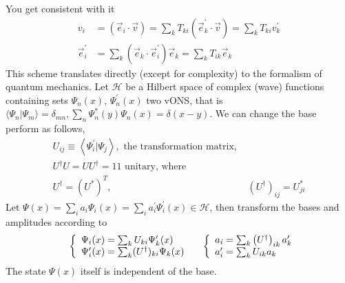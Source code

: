 You get consistent with it
\begin{equation}
\begin{aligned} v_{i} &=\left(\vec{e}_{i} \cdot \vec{v}\right)=\sum_{k} T_{k i}\left(\vec{e}_{k}^{\prime} \cdot \vec{v}\right)=\sum_{k} T_{k i} v_{k}^{\prime} \\ \vec{e}_{i}^{\prime} &=\sum_{k}\left(\vec{e}_{k} \cdot \vec{e}_{i}^{\prime}\right) \vec{e}_{k}=\sum_{k} T_{i k} \vec{e}_{k} \end{aligned}
\end{equation}
This scheme translates directly (except for complexity) to the formalism of quantum mechanics. Let $\mathcal{H}$ be a Hilbert space of complex (wave) functions containing sets {$\Psi_n(x)$}, {$\Psi_n^{\prime}(x)$} two vONS, that is $\langle\Psi_n|\Psi_m\rangle=\delta_{mn},\sum_n\Psi^*_n(y)\Psi_n(x)=\delta(x-y)$. We can change the base perform as follows,
\begin{equation}
\begin{aligned} U_{i j} \equiv\left\langle\Psi_{i}^{\prime} | \Psi_{j}\right\rangle, \text { the transformation matrix, } \\ U^{\dagger} U=U U^{\dagger}=11 \text { unitary, where } \\ U^{\dagger}=\left(U^{*}\right)^{T}, &\left(U^{\dagger}\right)_{i j}=U_{j i}^{*} \end{aligned}
\end{equation}
Let $\Psi(x)=\sum_ia_i\Psi_i(x)=\sum_ia^{\prime}_i\Psi_i^{\prime}(x)\in\mathcal{H}$, then transform the bases and amplitudes according to
\begin{equation}
\quad\left\{\begin{array}{l}{\Psi_{i}(x)=\sum_{k} U_{k i} \Psi_{k}^{\prime}(x)} \\ {\Psi_{i}^{\prime}(x)=\sum_{k} (U^{\dagger})_{ki} \Psi_k(x)}\end{array}\right.\\
\quad\left\{\begin{array}{l}{a_{i}=\sum_{k}\left(U^{\dagger}\right)_{i k} a_{k}^{\prime}} \\ {a_{i}^{\prime}=\sum_{k} U_{i k} a_{k}}\end{array}\right.
\end{equation}
The state $\Psi(x)$ itself is independent of the base.\\\\
